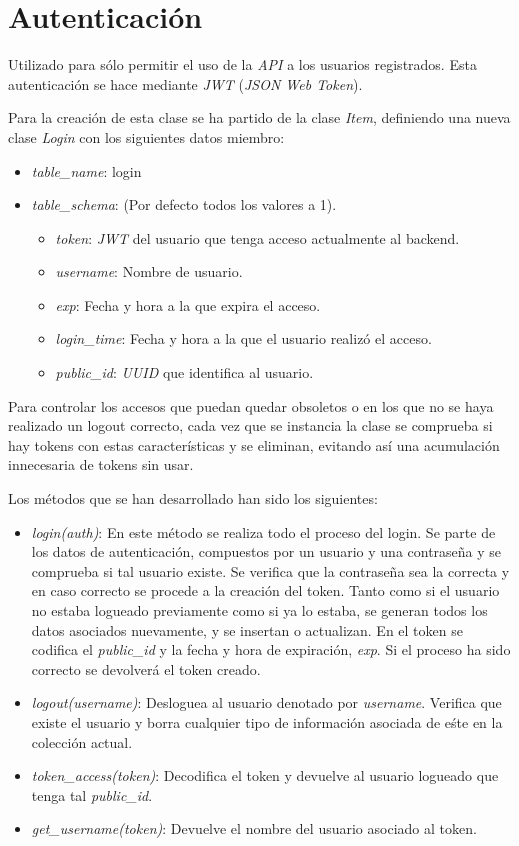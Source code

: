 \section{Autenticación}

Utilizado para sólo permitir el uso de la \textit{API} a los usuarios registrados. Esta autenticación se hace mediante \textit{JWT} (\textit{JSON Web Token}).

Para la creación de esta clase se ha partido de la clase \textit{Item}, definiendo una nueva clase \textit{Login} con los siguientes datos miembro:
\begin{itemize}
	\item \textit{table\_name}: login
	\item \textit{table\_schema}: (Por defecto todos los valores a 1).
	\begin{itemize}
		\item \textit{token}: \textit{JWT} del usuario que tenga acceso actualmente al backend.
		\item \textit{username}: Nombre de usuario.
		\item \textit{exp}: Fecha y hora a la que expira el acceso.
		\item \textit{login\_time}: Fecha y hora a la que el usuario realizó el acceso.
		\item \textit{public\_id}: \textit{UUID} que identifica al usuario.
	\end{itemize}
\end{itemize}



\bigskip
Para controlar los accesos que puedan quedar obsoletos o en los que no se haya realizado un logout correcto, cada vez que se instancia la clase se comprueba si hay tokens con estas características y se eliminan, evitando así una acumulación innecesaria de tokens sin usar.

\bigskip
Los métodos que se han desarrollado han sido los siguientes:
\begin{itemize}
	\item \textit{login(auth)}: En este método se realiza todo el proceso del login. Se parte de los datos de autenticación, compuestos por un usuario y una contraseña y se comprueba si tal usuario existe. Se verifica que la contraseña sea la correcta y en caso correcto se procede a la creación del token. Tanto como si el usuario no estaba logueado previamente como si ya lo estaba, se generan todos los datos asociados nuevamente, y se insertan o actualizan. En el token se codifica el \textit{public\_id} y la fecha y hora de expiración, \textit{exp}. Si el proceso ha sido correcto se devolverá el token creado.
	\item \textit{logout(username)}: Desloguea al usuario denotado por \textit{username}. Verifica que existe el usuario y borra cualquier tipo de información asociada de eśte en la colección actual.
	\item \textit{token\_access(token)}: Decodifica el token y devuelve al usuario logueado que tenga tal \textit{public\_id}.
	\item \textit{get\_username(token)}: Devuelve el nombre del usuario asociado al token.
\end{itemize}


